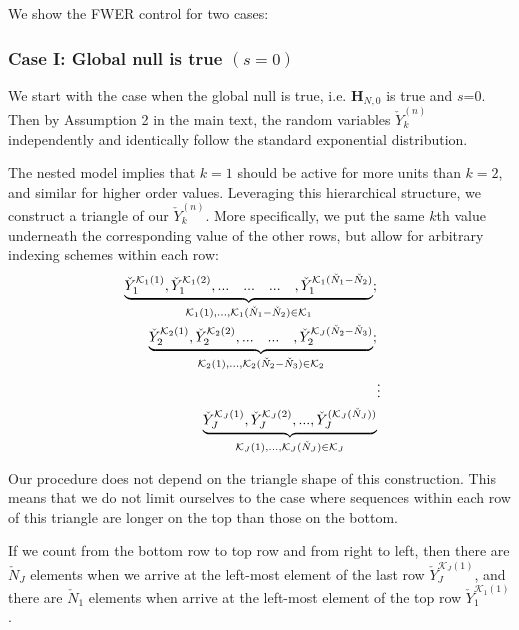 \documentclass[11pt]{article}
\newcommand{\q}{\text{\quad}}
\begin{document}
	We show the FWER control for two cases:
	\subsubsection*{Case I: Global null is true $(s=0)$}\label{thm4p1}
	
	We start with the case when the global null is true, i.e. $\bm{H}_{N,0}$ is true and $s$=0. Then by Assumption 2 in the main text, the random variables $\check{Y}_k^{(n)}$ independently and identically follow the standard exponential distribution.
	
	The nested model implies that $k=1$ should be active for more units than $k=2$, and similar for higher order values. Leveraging this hierarchical structure, we construct a triangle of our $\check{Y}_k^{(n)}$. More specifically, we put the same $k$th value underneath the corresponding value of the other rows, but allow for arbitrary indexing schemes within each row:
	\begin{equation}
		\begin{split}
			\underbrace{\check{Y}_1^{\mathcal{K}_1(1)},\check{Y}_1^{\mathcal{K}_1(2)},...\q...\q...\q,\check{Y}_1^{\mathcal{K}_1(\check{N}_{1}-\check{N}_2)}}_{\mathcal{K}_1(1),...,\mathcal{K}_1(\check{N}_{1}-\check{N}_2)\in\mathcal{K}_1};\\
			\underbrace{\check{Y}_2^{\mathcal{K}_2(1)},\check{Y}_2^{\mathcal{K}_2(2)},...\q...\q,\check{Y}_2^{\mathcal{K}_J(\check{N}_{2}-\check{N}_3)}}_{\mathcal{K}_2(1),...,\mathcal{K}_2(\check{N}_{2}-\check{N}_3)\in\mathcal{K}_2};\\
			&\vdots\\
			\underbrace{\check{Y}_J^{\mathcal{K}_J(1)},\check{Y}_J^{\mathcal{K}_J(2)},...,\check{Y}_J^{(\mathcal{K}_J(\check{N}_J))}}_{\mathcal{K}_J(1),...,\mathcal{K}_J(\check{N}_J)\in\mathcal{K}_J}
		\end{split}
	\end{equation}
	
	Our procedure does not depend on the triangle shape of this construction. This means that we do not limit ourselves to the case where sequences within each row of this triangle are longer on the top than those on the bottom.
	
	If we count from the bottom row to top row and from right to left, then there are $\check{N}_J$ elements when we arrive at the left-most element of the last row $\check{Y}_J^{\mathcal{K}_J(1)}$, and there are $\check{N}_1$ elements when arrive at the left-most element of the top row $\check{Y}_1^{\mathcal{K}_1(1)}$. 
	
\end{document}
